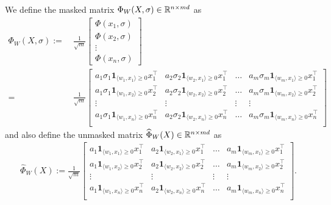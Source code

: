 \begin{definition}\label{def:Phi_first_time}
We define the masked matrix $\Phi_{W}(X, \sigma)\in \mathbb{R}^{n \times md}$ as %
\begin{align*}
    \Phi_{W}(X,\sigma) := & ~ \frac{1}{\sqrt{m}}\left[
    \begin{matrix}
    \Phi(x_1, \sigma)\\
    \Phi(x_2, \sigma)\\
    \vdots\\
    \Phi(x_n, \sigma)
    \end{matrix}
    \right] \\
    = & ~
    \frac{1}{\sqrt{m}}\left[
    \begin{matrix}
    a_1 \sigma_1  \mathbf{1}_{\langle w_{1}, x_1\rangle \geq 0} x_1^{\top} & a_2 \sigma_2 \mathbf{1}_{\langle w_{2}, x_1\rangle \geq 0} x_1^{\top} &\ldots &a_m \sigma_m \mathbf{1}_{\langle w_{m}, x_1\rangle \geq 0} x_1^{\top}\\
    a_1 \sigma_1 \mathbf{1}_{\langle w_{1}, x_2\rangle \geq 0} x_2^{\top} & a_2 \sigma_2 \mathbf{1}_{\langle w_{2}, x_2\rangle \geq 0} x_2^{\top} &\ldots &a_m \sigma_m \mathbf{1}_{\langle w_{m}, x_2\rangle \geq 0} x_2^{\top}\\
    \vdots &\vdots &\vdots &\vdots\\
    a_1 \sigma_1 \mathbf{1}_{\langle w_{1}, x_n\rangle \geq 0} x_n^{\top} & a_2 \sigma_2 \mathbf{1}_{\langle w_{2}, x_n\rangle \geq 0} x_n^{\top} &\ldots &a_m \sigma_m \mathbf{1}_{\langle w_{m}, x_n\rangle \geq 0} x_n^{\top}\\
    \end{matrix}
    \right]
\end{align*}
and also define the unmasked matrix $\widehat{\Phi}_W(X)\in\mathbb{R}^{n\times md}$ as
\begin{align*}
    \hat{\Phi}_W(X) := \frac{1}{\sqrt{m}}\left[
    \begin{matrix}
    a_1  \mathbf{1}_{\langle w_{1}, x_1\rangle \geq 0} x_1^{\top} & a_2 \mathbf{1}_{\langle w_{2}, x_1\rangle \geq 0} x_1^{\top} &\ldots &a_m \mathbf{1}_{\langle w_{m}, x_1\rangle \geq 0} x_1^{\top}\\
    a_1 \mathbf{1}_{\langle w_{1}, x_2\rangle \geq 0} x_2^{\top} & a_2 \mathbf{1}_{\langle w_{2}, x_2\rangle \geq 0} x_2^{\top} &\ldots &a_m \mathbf{1}_{\langle w_{m}, x_2\rangle \geq 0} x_2^{\top}\\
    \vdots &\vdots &\vdots &\vdots\\
    a_1 \mathbf{1}_{\langle w_{1}, x_n\rangle \geq 0} x_n^{\top} & a_2 \mathbf{1}_{\langle w_{2}, x_n\rangle \geq 0} x_n^{\top} &\ldots &a_m \mathbf{1}_{\langle w_{m}, x_n\rangle \geq 0} x_n^{\top}\\
    \end{matrix}
    \right].
\end{align*}
\end{definition}

